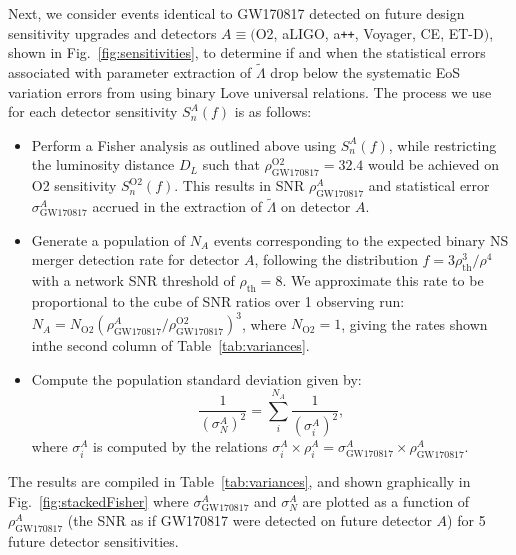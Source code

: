\documentclass[prd,twocolumn,nofootinbib,superscriptaddress,amsmath,amssymb]{revtex4-1}
\begin{document}
Next, we consider events identical to GW170817 detected on future design sensitivity upgrades and detectors $A \equiv ($O2, aLIGO, a\texttt{++}, Voyager, CE, ET-D$)$, shown in Fig.~\ref{fig:sensitivities}, to determine if and when the statistical errors associated with parameter extraction of $\tilde{\Lambda}$ drop below the systematic EoS variation errors from using binary Love universal relations.
The process we use for each detector sensitivity $S_n^A(f)$ is as follows:
\begin{itemize}
\item Perform a Fisher analysis as outlined above using $S_n^A(f)$, while restricting the luminosity distance $D_L$ such that $\rho^{\text{O2}}_{\text{GW170817}}=32.4$ would be achieved on O2 sensitivity $S_n^{\text{O2}}(f)$.
This results in SNR $\rho^A_{\text{GW170817}}$ and statistical error $\sigma_\text{GW170817}^A$ accrued in the extraction of $\tilde{\Lambda}$ on detector $A$.
\item Generate a population of $N_A$ events corresponding to the expected binary NS merger detection rate for detector $A$, following the distribution $f=3 \rho_{\text{th}}^3/\rho^4$~\cite{Shutz:SNR,Chen:SNR} with a network SNR threshold of $\rho_{\text{th}}=8$.
We approximate this rate to be proportional to the cube of SNR ratios over 1 observing run: $N_A = N_{\text{O2}} (\rho^A_{\text{GW170817}}/\rho^{\text{O2}}_{\text{GW170817}})^3$, where $N_{\text{O2}}=1$, giving the rates shown inthe second column of Table~\ref{tab:variances}.
\item Compute the population standard deviation given by:
\begin{equation}
\frac{1}{(\sigma_N^A)^2}=\sum_i^{N_A}\frac{1}{(\sigma_i^A)^2},
\end{equation}
where $\sigma_i^A$ is computed by the relations $\sigma_i^A \times \rho_i^A = \sigma_{\text{GW170817}}^A \times \rho_{\text{GW170817}}^A$.
\end{itemize}
The results are compiled in Table~\ref{tab:variances}, and shown graphically in Fig.~\ref{fig:stackedFisher} where $\sigma^A_{\text{GW170817}}$ and $\sigma^A_N$ are plotted as a function of $\rho^A_{\text{GW170817}}$ (the SNR as if GW170817 were detected on future detector $A$) for 5 future detector sensitivities.
\end{document}
